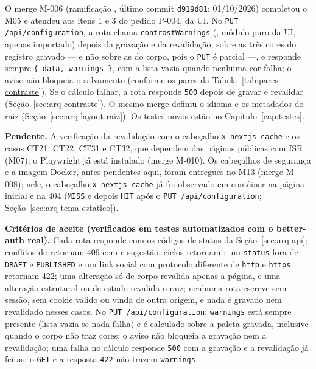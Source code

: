 O merge M-006 (ramificação , último commit \texttt{d919d81}; 01/10/2026) completou o M05 e atendeu aos itens 1 e 3 do pedido P-004, da UI. No \texttt{PUT /api/configuration}, a rota chama \texttt{contrastWarnings} (, módulo puro da UI, apenas importado) depois da gravação e da revalidação, sobre as três cores do registro gravado --- e não sobre as do corpo, pois o \texttt{PUT} é parcial ---, e responde sempre \texttt{\{ data, warnings \}}, com a lista vazia quando nenhuma cor falha; o aviso não bloqueia o salvamento (conforme os pares da Tabela~\ref{tab:pares-contraste}). Se o cálculo falhar, a rota responde \texttt{500} depois de gravar e revalidar (Seção~\ref{sec:arq-contraste}). O mesmo merge definiu o idioma e os metadados do  raiz (Seção~\ref{sec:arq-layout-raiz}). Os testes novos estão no Capítulo~\ref{cap:testes}.

\textbf{Pendente.} A verificação da revalidação com o cabeçalho \texttt{x-nextjs-cache} e os casos CT21, CT22, CT31 e CT32, que dependem das páginas públicas com ISR (M07); o Playwright já está instalado (merge M-010). Os cabeçalhos de segurança e a imagem Docker, antes pendentes aqui, foram entregues no M13 (merge M-008); nele, o cabeçalho \texttt{x-nextjs-cache} já foi observado em contêiner na página inicial e na 404 (\texttt{MISS} e depois \texttt{HIT} após o \texttt{PUT /api/configuration}; Seção~\ref{sec:arq-tema-estatico}).

\textbf{Critérios de aceite (verificados em testes automatizados com o better-auth real).} Cada rota responde com os códigos de status da Seção~\ref{sec:arq-api}; conflitos de  retornam 409 com  e sugestão; ciclos retornam ; um \texttt{status} fora de \texttt{DRAFT} e \texttt{PUBLISHED} e um link social com protocolo diferente de \texttt{http} e \texttt{https} retornam 422; uma alteração só de corpo revalida apenas a página, e uma alteração estrutural ou de estado revalida o  raiz; nenhuma rota escreve sem sessão, sem cookie válido ou vinda de outra origem, e nada é gravado nem revalidado nesses casos. No \texttt{PUT /api/configuration}: \texttt{warnings} está sempre presente (lista vazia se nada falha) e é calculado sobre a paleta gravada, inclusive quando o corpo não traz cores; o aviso não bloqueia a gravação nem a revalidação; uma falha no cálculo responde \texttt{500} com a gravação e a revalidação já feitas; o \texttt{GET} e a resposta \texttt{422} não trazem \texttt{warnings}.

